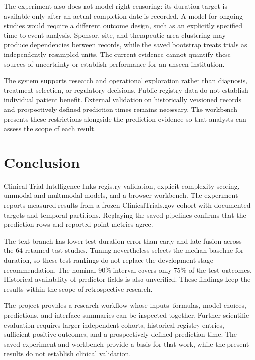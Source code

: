 \documentclass[10pt,letterpaper,twocolumn]{article}
\begin{document}
The experiment also does not model right censoring: its duration target is available only after an actual completion date is recorded. A model for ongoing studies would require a different outcome design, such as an explicitly specified time-to-event analysis. Sponsor, site, and therapeutic-area clustering may produce dependencies between records, while the saved bootstrap treats trials as independently resampled units. The current evidence cannot quantify these sources of uncertainty or establish performance for an unseen institution.

The system supports research and operational exploration rather than diagnosis, treatment selection, or regulatory decisions. Public registry data do not establish individual patient benefit. External validation on historically versioned records and prospectively defined prediction times remains necessary. The workbench presents these restrictions alongside the prediction evidence so that analysts can assess the scope of each result.

\section{Conclusion}

Clinical Trial Intelligence links registry validation, explicit complexity scoring, unimodal and multimodal models, and a browser workbench. The experiment reports measured results from a frozen ClinicalTrials.gov cohort with documented targets and temporal partitions. Replaying the saved pipelines confirms that the prediction rows and reported point metrics agree.

The text branch has lower test duration error than early and late fusion across the 64 retained test studies. Tuning nevertheless selects the median baseline for duration, so these test rankings do not replace the development-stage recommendation. The nominal 90\% interval covers only 75\% of the test outcomes. Historical availability of predictor fields is also unverified. These findings keep the results within the scope of retrospective research.

The project provides a research workflow whose inputs, formulas, model choices, predictions, and interface summaries can be inspected together. Further scientific evaluation requires larger independent cohorts, historical registry entries, sufficient positive outcomes, and a prospectively defined prediction time. The saved experiment and workbench provide a basis for that work, while the present results do not establish clinical validation.
\end{document}
